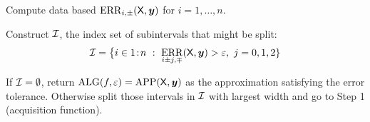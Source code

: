\documentclass[10pt,compress,xcolor={usenames,dvipsnames},aspectratio=169]{beamer}
\DeclareMathOperator{\app}{APP}
\DeclareMathOperator{\alg}{ALG}
\DeclareMathOperator{\ERR}{ERR}
\begin{document}
\begin{frame}
	
	\vspace{-2ex}
	
	\begin{description}
		\item<2->[Step 1.] Compute data based $\ERR_{i,\pm}(\mX,\vy)$ for $i = 1, \ldots, n$.
		\item<2->[Step 2.] Construct $\mathcal{I}$, the index set of subintervals that might be split:
		\begin{equation*}
		\ci = \bigl\{i \in 1\! :\! n \ : \ \ERR_{i\pm j,\mp}(\mX,\vy) > \varepsilon, \ j = 0, 1, 2\}
		\end{equation*}
		\item<3->[Step 3.]  If $\mathcal{I} = \emptyset$, return $\alg(f,\varepsilon) = \app(\mX,\vy)$ as the approximation satisfying the error tolerance.  Otherwise split those intervals in $\mathcal{I}$ with largest width and go to Step 1 (\alert{acquisition function}). 
	\end{description}
	
\end{frame}
\end{document}
